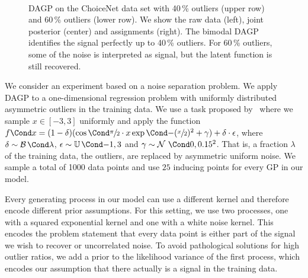 \begin{figure}[t]
    \centering
    \hspace{-7pt}%
    \hspace{-7pt}%
    \\%
    \vspace{\figureskip}%
    \hspace{-7pt}%
    \hspace{-7pt}%
    \caption[DAGP noise separation experiment]{
        \label{fig:data_association:choicenet}
        DAGP on the ChoiceNet data set with 40\,\% outliers (upper row) and 60\,\% outliers (lower row).
        We show the raw data (left), joint posterior (center) and assignments (right).
        The bimodal DAGP identifies the signal perfectly up to 40\,\% outliers.
        For 60\,\% outliers, some of the noise is interpreted as signal, but the latent function is still recovered.
    }
\end{figure}
%
We consider an experiment based on a noise separation problem.
We apply DAGP to a one-dimensional regression problem with uniformly distributed asymmetric outliers in the training data.
We use a task proposed by~\textcite{choi_choicenet_2018} where we sample $x \in [-3, 3]$ uniformly and apply the function $\Fun{f}{x} = (1 - \delta)(\Fun{\cos}{\sfrac{\pi}{2} \cdot x}\Fun{\exp}{-(\sfrac{x}{2})^2} + \gamma) + \delta \cdot \epsilon$, where $\delta \sim \Fun{\Ber}{\lambda}$, $\epsilon \sim \Fun{\Uni}{-1, 3}$ and $\gamma \sim \Gaussian{0, 0.15^2}$.
That is, a fraction $\lambda$ of the training data, the outliers, are replaced by asymmetric uniform noise.
We sample a total of 1000 data points and use $25$ inducing points for every GP in our model.

Every generating process in our model can use a different kernel and therefore encode different prior assumptions.
For this setting, we use two processes, one with a squared exponential kernel and one with a white noise kernel.
This encodes the problem statement that every data point is either part of the signal we wish to recover or uncorrelated noise.
To avoid pathological solutions for high outlier ratios, we add a prior to the likelihood variance of the first process, which encodes our assumption that there actually is a signal in the training data.

